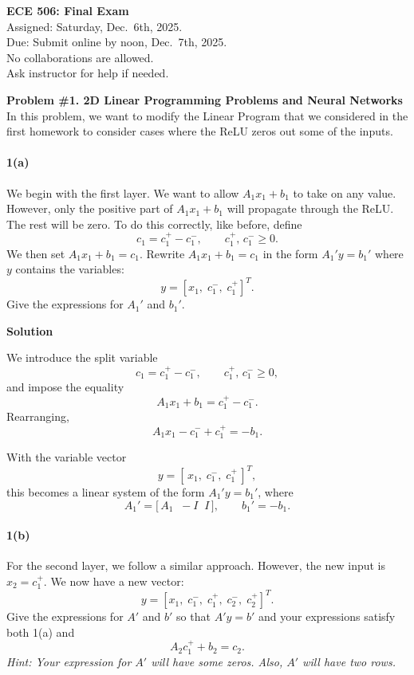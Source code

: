 \documentclass[11pt]{article}
\begin{document}
	
	\begin{center}
		{\LARGE \textbf{ECE 506: Final Exam}} \\[1.2em]
		{\large Assigned: Saturday, Dec.\ 6th, 2025. \\ 
			Due: Submit online by noon, Dec.\ 7th, 2025. \\[0.5em]
			No collaborations are allowed. \\ 
			Ask instructor for help if needed.}
	\end{center}
	
	\vspace{1em}
	
	\noindent\textbf{Problem \#1. 2D Linear Programming Problems and Neural Networks} \\
	In this problem, we want to modify the Linear Program that we considered in the first homework to consider cases where the ReLU zeros out some of the inputs.
	
	\paragraph{1(a)} We begin with the first layer. We want to allow $A_1 x_1 + b_1$ to take on any value. However, only the positive part of $A_1 x_1 + b_1$ will propagate through the ReLU. The rest will be zero.  
	To do this correctly, like before, define
	\[
	c_1 = c_1^{+} - c_1^{-}, \qquad c_1^{+},\, c_1^{-} \ge 0.
	\]
	We then set $A_1 x_1 + b_1 = c_1$. Rewrite $A_1 x_1 + b_1 = c_1$ in the form $A_1' y = b_1'$ where $y$ contains the variables:
	\[
	y = [x_1,\; c_1^{-},\; c_1^{+}]^T.
	\]
	Give the expressions for $A_1'$ and $b_1'$.
	
	\noindent\textbf{Solution}
	
	We introduce the split variable
	\[
	c_1 = c_1^+ - c_1^- , \qquad c_1^+,\, c_1^- \ge 0,
	\]
	and impose the equality
	\[
	A_1 x_1 + b_1 = c_1^+ - c_1^- .
	\]
	Rearranging,
	\[
	A_1 x_1 - c_1^- + c_1^+ = -b_1.
	\]
	
	With the variable vector
	\[
	y = [\,x_1,\; c_1^-,\; c_1^+\,]^T,
	\]
	this becomes a linear system of the form $A_1' y = b_1'$, where
	\[
	A_1' = \big[\, A_1 \;\; -I \;\; I \,\big], 
	\qquad
	b_1' = -b_1.
	\]
	
	\paragraph{1(b)} For the second layer, we follow a similar approach. However, the new input is $x_2 = c_1^{+}$.  
	We now have a new vector:
	\[
	y = [x_1,\; c_1^{-},\; c_1^{+},\; c_2^{-},\; c_2^{+}]^T.
	\]
	Give the expressions for $A'$ and $b'$ so that $A' y = b'$ and your expressions satisfy both 1(a) and
	\[
	A_2 c_1^{+} + b_2 = c_2.
	\]
	\textit{Hint: Your expression for $A'$ will have some zeros. Also, $A'$ will have two rows.}
	
\end{document}
